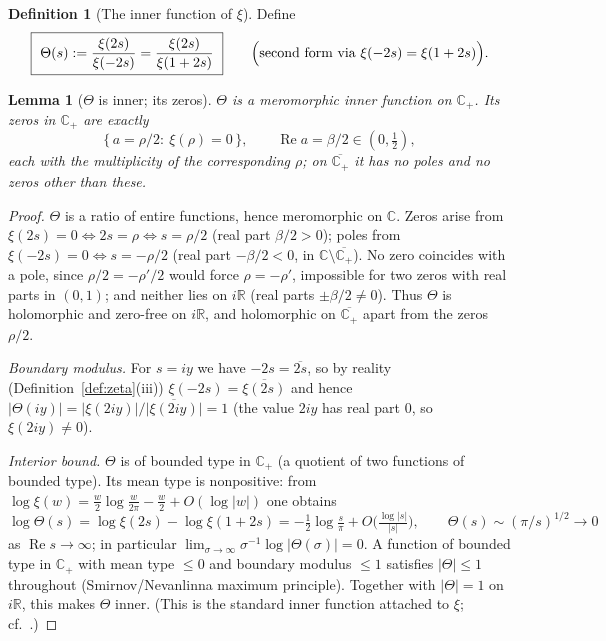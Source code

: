 \documentclass[11pt]{amsart}
\theoremstyle{plain}
\newtheorem{lemma}{Lemma}
\theoremstyle{definition}
\newtheorem{definition}{Definition}
\theoremstyle{remark}
\newcommand{\C}{\mathbb{C}}
\newcommand{\R}{\mathbb{R}}
\newcommand{\Cp}{\mathbb{C}_{+}}
\newcommand{\abs}[1]{\lvert #1 \rvert}
\renewcommand{\Re}{\operatorname{Re}}
\begin{document}
\begin{definition}[The inner function of $\xi$]\label{def:theta}
Define
\begin{equation}\label{eq:theta}
  \boxed{\ \Theta(s):=\frac{\xi(2s)}{\xi(-2s)}=\frac{\xi(2s)}{\xi(1+2s)}\ }
  \qquad\Bigl(\text{second form via }\xi(-2s)=\xi(1+2s)\Bigr).
\end{equation}
\end{definition}

\begin{lemma}[$\Theta$ is inner; its zeros]\label{lem:inner}
$\Theta$ is a meromorphic inner function on $\Cp$. Its zeros in $\Cp$ are exactly
\[
  \bigl\{\,a=\rho/2:\ \xi(\rho)=0\,\bigr\},\qquad \Re a=\beta/2\in(0,\tfrac12),
\]
each with the multiplicity of the corresponding $\rho$; on $\overline{\Cp}$ it has no
poles and no zeros other than these.
\end{lemma}

\begin{proof}
$\Theta$ is a ratio of entire functions, hence meromorphic on $\C$. Zeros arise from
$\xi(2s)=0\iff2s=\rho\iff s=\rho/2$ (real part $\beta/2>0$); poles from
$\xi(-2s)=0\iff s=-\rho/2$ (real part $-\beta/2<0$, in $\C\setminus\overline{\Cp}$). No
zero coincides with a pole, since $\rho/2=-\rho'/2$ would force $\rho=-\rho'$, impossible
for two zeros with real parts in $(0,1)$; and neither lies on $i\R$ (real parts
$\pm\beta/2\neq0$). Thus $\Theta$ is holomorphic and zero-free on $i\R$, and holomorphic
on $\overline{\Cp}$ apart from the zeros $\rho/2$.

\emph{Boundary modulus.} For $s=iy$ we have $-2s=\overline{2s}$, so by reality
(Definition~\ref{def:zeta}(iii)) $\xi(-2s)=\overline{\xi(2s)}$ and hence
$\abs{\Theta(iy)}=\abs{\xi(2iy)}/\bigl|\overline{\xi(2iy)}\bigr|=1$
(the value $2iy$ has real part $0$, so $\xi(2iy)\neq0$).

\emph{Interior bound.} $\Theta$ is of bounded type in $\Cp$ (a quotient of two functions
of bounded type). Its mean type is nonpositive: from
$\log\xi(w)=\tfrac w2\log\tfrac{w}{2\pi}-\tfrac w2+O(\log\abs{w})$ one obtains
\[
  \log\Theta(s)=\log\xi(2s)-\log\xi(1+2s)=-\tfrac12\log\tfrac{s}{\pi}+O\!\bigl(\tfrac{\log\abs{s}}{\abs{s}}\bigr),
  \qquad \Theta(s)\sim(\pi/s)^{1/2}\to0
\]
as $\Re s\to\infty$; in particular $\lim_{\sigma\to\infty}\sigma^{-1}\log\abs{\Theta(\sigma)}=0$.
A function of bounded type in $\Cp$ with mean type $\le0$ and boundary modulus $\le1$
satisfies $\abs{\Theta}\le1$ throughout (Smirnov/Nevanlinna maximum principle). Together
with $\abs{\Theta}=1$ on $i\R$, this makes $\Theta$ inner. (This is the standard inner
function attached to $\xi$; cf.\ \cite{nikolski,uetake}.)
\end{proof}
\end{document}
